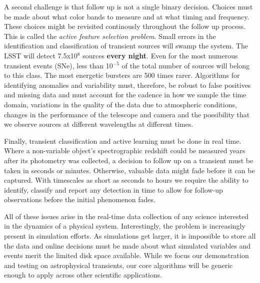 \documentclass[prd,nofootbib,floatfix,11pt,tightenlines,nofootinbib]{revtex4}
\begin{document}
A second challenge is that follow up is not a single binary decision.
Choices must be made about what color bands to measure and at what timing
and frequency.  These choices might be revisited continously throughout the
follow up process.  This is called the {\em active feature selection
  problem}. Small errors in the identification and classification of transient
sources will swamp the system.  The LSST will detect 7.5x10$^8$ sources
{\bf every night}.  Even for the most numerous transient events (SNe), less
than 10$^{-5}$ of the total number of sources will belong to this class.
The most energetic bursters are 500 times rarer.  Algorithms for
identifying anomalies and variability must, therefore, be robust to false
positives and missing data and must account for the cadence in how we
sample the time domain, variations in the quality of the data due to
atmospheric conditions, changes in the performance of the telescope and
camera and the possibility that we observe sources at different wavelengths
at different times.

Finally, transient classification and active learning must be done in real
time.  Where a non-variable object's spectrographic redshift could be measured years
after its photometry was collected, a decision to follow up on a transient
must be taken in seconds or minutes. Otherwise, valuable data
might fade before it can be captured.  With timescales as short as seconds
to hours we require the ability to identify, classify and report any
detection in time to allow for follow-up observations before the initial
phenomenon fades.



All of these issues arise in the real-time data collection of any science
interested in the dynamics of a physical system.  Interestingly, the
problem is increasingly present in simulation efforts.  As simulations get
larger, it is impossible to store all the data and online decisions must be
made about what simulated variables and events merit the limited disk space
available.  While we focus our demonstration and testing on astrophysical
transients, our core algorithms will be generic enough to apply across
other scientific applications.
\end{document}
